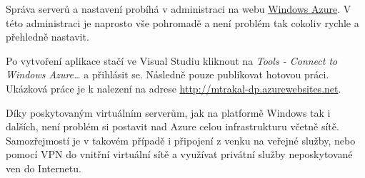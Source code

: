 Správa serverů a nastavení probíhá v administraci na webu \href{https://manage.windowsazure.com}{Windows Azure\cite{azure:manage}}. V této administraci je naprosto vše pohromadě a není problém tak cokoliv rychle a přehledně nastavit.

Po vytvoření aplikace stačí ve Visual Studiu kliknout na \textit{Tools - Connect to Windows Azure\ldots} a přihlásit se. Následně pouze publikovat hotovou práci. Ukázková práce je k nalezení na adrese \href{http://mtrakal-dp.azurewebsites.net}{http://mtrakal-dp.azurewebsites.net}.

Díky poskytovaným virtuálním serverům, jak na platformě Windows tak i dalších, není problém si postavit nad Azure celou infrastrukturu včetně sítě. Samozřejmostí je v takovém případě i připojení z venku na veřejné služby, nebo pomocí VPN do vnitřní virtuální sítě a využívat privátní služby neposkytované ven do Internetu.

